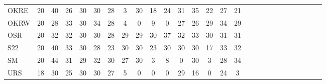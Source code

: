\documentclass[varwidth=\maxdimen,border=1pt]{standalone}
\begin{document}
\begin{tabular*}{14cm}{ l @{\extracolsep{\fill}} *{26}{c} }
  OKRE &  20 &  40 &  26 &  30 &  30 &  28 &   3 &  30 &  18 &  24 &  31 &  35 &  22 &  27 &  21 \\ 
  OKRW &  20 &  28 &  33 &  30 &  34 &  28 &   4 &   0 &   9 &   0 &  27 &  26 &  29 &  34 &  29 \\ 
  OSR &  20 &  32 &  32 &  30 &  30 &  28 &  29 &  29 &  30 &  37 &  32 &  33 &  30 &  31 &  31 \\ 
  S22 &  20 &  40 &  33 &  30 &  28 &  23 &  30 &  30 &  23 &  30 &  30 &  30 &  17 &  33 &  32 \\ 
  SM &  20 &  44 &  31 &  29 &  32 &  30 &  27 &  30 &   3 &   8 &   0 &  30 &   3 &  28 &  34 \\ 
  URS &  18 &  30 &  25 &  30 &  30 &  27 &   5 &   0 &   0 &   0 &  29 &  16 &   0 &  24 &   3 \\    \hline
\end{tabular*}

 
\end{document}
